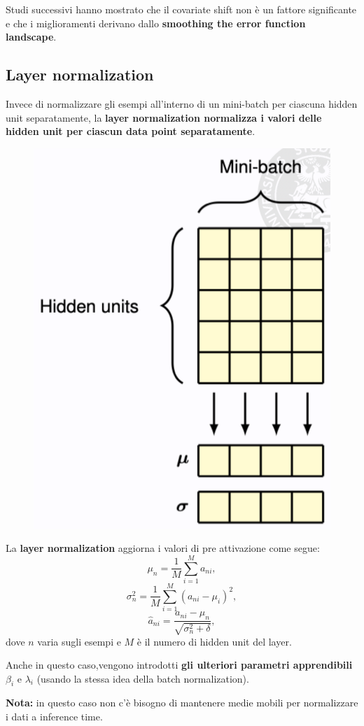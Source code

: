 Studi successivi hanno mostrato che il covariate shift non è un fattore significante e che i miglioramenti derivano dallo \textbf{smoothing the error function landscape}.


\subsection{Layer normalization}
Invece di normalizzare gli esempi all'interno di un mini-batch per ciascuna hidden unit separatamente, la \textbf{layer normalization normalizza i valori delle hidden unit per ciascun data point separatamente}.
\begin{figure}[h]
    \includegraphics[scale=.4]{images/best_practices/layer_norm.png}
    \centering
\end{figure}


La \textbf{layer normalization} aggiorna i valori di pre attivazione come segue:
\begin{equation}
    \mu_n=\frac{1}{M}\sum^M_{i=1}a_{ni},
\end{equation}
\begin{equation}
    \sigma^2_n=\frac{1}{M}\sum^M_{i=1}(a_{ni}-\mu_i)^2,
\end{equation}
\begin{equation}
    \hat{a}_{ni}=\frac{a_{ni}-\mu_n}{\sqrt{\sigma^2_n+\delta}},
\end{equation}
dove $n$ varia sugli esempi e $M$ è il numero di hidden unit del layer.


Anche in questo caso,vengono introdotti \textbf{gli ulteriori parametri apprendibili} $\beta_i$ e $\lambda_i$ (usando la stessa idea della batch normalization).


\textbf{Nota:} in questo caso non c'è bisogno di mantenere medie mobili per normalizzare i dati a inference time.